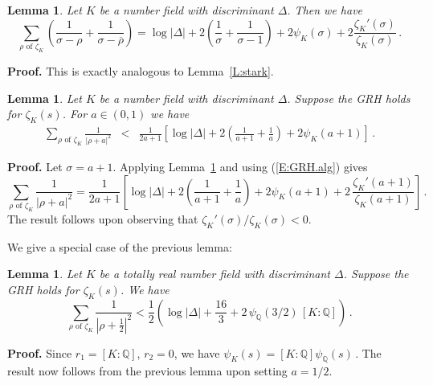 \documentclass{amsart}
\newtheorem{lemma}[theorem]{Lemma}
\numberwithin{equation}{section}
\numberwithin{table}{section}
\begin{document}
\begin{lemma}\label{L:stark2}
Let $K$ be a number field with discriminant $\Delta$.
Then we have
$$
\sum_{\rho\text{ of $\zeta_K$}}
\left(
\frac{1}{\sigma-\rho}+\frac{1}{\sigma-\overline{\rho}}
\right)
=
\log|\Delta|
+
2
\left(\frac{1}{\sigma}+\frac{1}{\sigma-1}\right)
+
2\psi_K(\sigma)
+
2
\frac{\zeta_K'(\sigma)}{\zeta_K(\sigma)}
\,.
$$
\end{lemma}

\noindent\textbf{Proof.}
This is exactly analogous to Lemma~\ref{L:stark}.
{\raisebox{-.25ex}{\scalebox{.786}[1.272]{$\blacksquare$}}}

\begin{lemma}
Let $K$ be a number field with discriminant $\Delta$.
Suppose the GRH holds for $\zeta_K(s)$.
For $a\in(0,1)$ we have
\begin{eqnarray*}
  \sum_{\rho\text{ of $\zeta_K$}}
  \frac{1}{|\rho+a|^2}
  &<&
  \frac{1}{2a+1}
  \left[
  \log|\Delta|
  +
  2
  \left(\frac{1}{a+1}+\frac{1}{a}\right)
  +
  2
  \psi_K(a+1)
  \right]
  \,.
\end{eqnarray*}
\end{lemma}

\noindent\textbf{Proof.}
Let $\sigma=a+1$.
Applying Lemma~\ref{L:stark2} and using (\ref{E:GRH.alg}) gives
$$
  \sum_{\rho\text{ of $\zeta_K$}}
  \frac{1}{|\rho+a|^2}
  =
  \frac{1}{2a+1}
  \left[
  \log|\Delta|
  +
  2
  \left(\frac{1}{a+1}+\frac{1}{a}\right)
  +
  2
  \psi_K(a+1)
    +
  2\,\frac{\zeta_K'(a+1)}{\zeta_K(a+1)}
  \right]
  \,.
$$
The result follows upon observing that $\zeta_K'(\sigma)/\zeta_K(\sigma)<0$.
{\raisebox{-.25ex}{\scalebox{.786}[1.272]{$\blacksquare$}}}

\vspace{1ex}

We give a special case of the previous lemma:
\begin{lemma}
Let $K$ be a totally real number field with discriminant $\Delta$.
Suppose the GRH holds for $\zeta_K(s)$.
We have
$$
  \sum_{\rho\text{ of $\zeta_K$}}
  \frac{1}{\left|\rho+\frac{1}{2}\right|^2}
<
\frac{1}{2}
\left(
\log|\Delta|
+
\frac{16}{3}
+
2\,\psi_{\mathbb{Q}}(3/2)\,
[K:{\mathbb{Q}}]
\right)
\,.
$$
\end{lemma}

\noindent\textbf{Proof.}
Since $r_1=[K:{\mathbb{Q}}]$, $r_2=0$, we have
$
\psi_K(s)=[K:{\mathbb{Q}}]\psi_{\mathbb{Q}}(s)
\,.
$
The result now follows from the previous lemma
upon setting $a=1/2$.
{\raisebox{-.25ex}{\scalebox{.786}[1.272]{$\blacksquare$}}}
\end{document}
